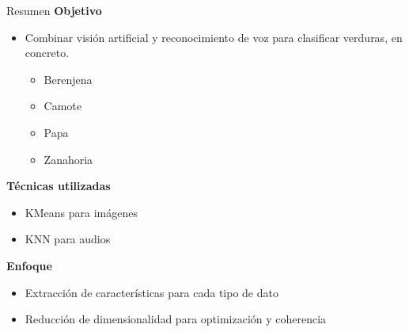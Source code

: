 \documentclass[12pt]{beamer}
\begin{document}
\begin{frame}{Resumen}
\textbf{Objetivo}
\begin{itemize}
    \item Combinar visión artificial y reconocimiento de voz para clasificar verduras, en concreto.
    \begin{itemize}
        \item Berenjena
        \item Camote
        \item Papa
        \item Zanahoria
    \end{itemize}
\end{itemize}

\textbf{Técnicas utilizadas}
\begin{itemize}
    \item KMeans para imágenes
    \item KNN para audios
\end{itemize}

\textbf{Enfoque}
\begin{itemize}
    \item Extracción de características para cada tipo de dato
    \item Reducción de dimensionalidad para optimización y coherencia
\end{itemize}
\end{frame}
\end{document}
